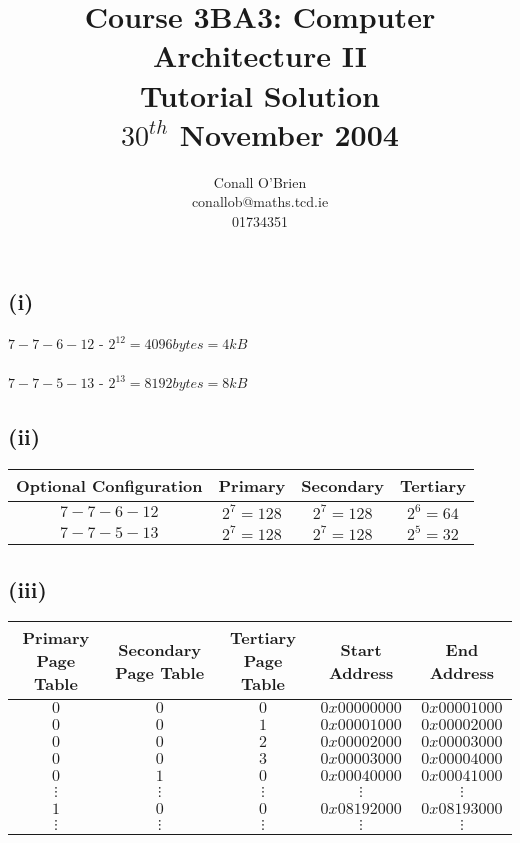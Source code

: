 \documentclass[a4paper,12pt]{article}
\begin{document}
\title{Course 3BA3: Computer Architecture II \\ Tutorial Solution\\$30^{th}$ November 2004}

\author{Conall O'Brien \\ conallob@maths.tcd.ie \\ 01734351}

\maketitle

\section{}

\subsection*{(i)}

$7-7-6-12$ - $2^{12} = 4096 bytes = 4kB$ \\ \\

$7-7-5-13$ - $2^{13} = 8192 bytes = 8kB$

\subsection*{(ii)}

\begin{tabular}{|c|c|c|c|}
\hline
Optional Configuration	&	Primary			&	Secondary		&	Tertiary			\\
\hline
$7-7-6-12$ 					&	$2^{7} = 128$	&	$2^{7} = 128$	&	$2^{6} = 64$	\\
\hline
$7-7-5-13$ 					&	$2^{7} = 128$	&	$2^{7} = 128$	&	$2^{5} = 32$	\\
\hline
\end{tabular}

\subsection*{(iii)}

\begin{tabular}{|c|c|c|c|c|}
\hline
Primary Page Table	&	Secondary Page Table	&	Tertiary Page Table	& Start Address	& End Address	\\
\hline
$0$	&	$0$	&	$0$	&	$0x00000000$	&	$0x00001000$	\\
$0$	&	$0$	&	$1$	&	$0x00001000$	&	$0x00002000$	\\
$0$	&	$0$	&	$2$	&	$0x00002000$	&	$0x00003000$	\\
$0$	&	$0$	&	$3$	&	$0x00003000$	&	$0x00004000$	\\
$0$	&	$1$	&	$0$	&	$0x00040000$	&	$0x00041000$	\\
$\vdots$	&	$\vdots$	&	$\vdots$	&	$\vdots$	&	$\vdots$		\\
$1$	&	$0$	&	$0$	&	$0x08192000$	&	$0x08193000$	\\
$\vdots$	&	$\vdots$	&	$\vdots$	&	$\vdots$	&	$\vdots$		\\
\hline
\end{tabular}
\end{document}

